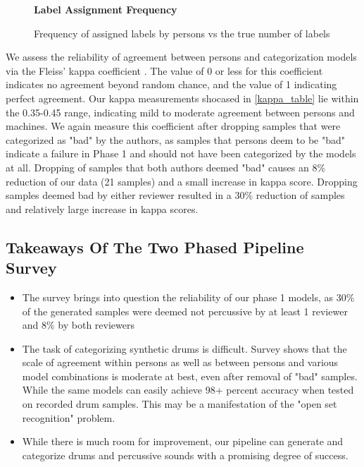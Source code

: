 \documentclass[\main/thesis.tex]{subfiles}
\begin{document}
\begin{figure}[h!]
    \begin{center}
    \textbf{Label Assignment Frequency}
    \end{center}
    \caption{Frequency of assigned labels by persons vs the true number of labels}
\label{fig:freq-survey-2p}
\end{figure}
We assess the reliability of agreement between persons and categorization models via the Fleiss' kappa coefficient \cite{fleiss1971measuring}. The value of 0 or less for this coefficient indicates no agreement beyond random chance, and the value of 1 indicating perfect agreement. Our kappa measurements shocased in \ref{kappa_table} lie within the 0.35-0.45 range, indicating mild to moderate agreement between persons and machines. We again measure this coefficient after dropping samples that were categorized as "bad" by the authors, as samples that persons deem to be "bad" indicate a failure in Phase 1 and should not have been categorized by the models at all. Dropping of samples that both authors deemed "bad" causes an 8\% reduction of our data (21 samples) and a small increase in kappa score. Dropping samples deemed bad by either reviewer resulted in a 30\% reduction of samples and relatively large increase in kappa scores. 

\subsection{Takeaways Of The Two Phased Pipeline Survey}
\label{survey1_takeaway}
\begin{itemize}
    \item The survey brings into question the reliability of our phase 1 models, as 30\% of the generated samples were deemed not percussive by at least 1 reviewer and 8\% by both reviewers
    \item The task of categorizing synthetic drums is difficult. Survey shows that the scale of agreement within persons as well as between persons and various model combinations is moderate at best, even after removal of "bad" samples.  While the same models can easily achieve 98+ percent accuracy when tested on recorded drum samples. This may be a manifestation of the "open set recognition" problem. 
    \item While there is much room for improvement, our pipeline can generate and categorize drums and percussive sounds with a promising degree of success. 
\end{itemize}
\end{document}
